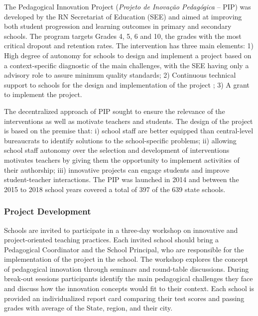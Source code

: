 \documentclass[11pt,a4paper]{article}
\begin{document}
	The Pedagogical Innovation Project (\textit{Projeto de Inovação Pedagógica} -- PIP) was developed by the RN Secretariat of Education (SEE) and aimed at improving both student progression and learning outcomes in primary and secondary schools. The program targets Grades 4, 5, 6 and 10, the grades with the most critical dropout and retention rates. The intervention has three main elements: 1) High degree of autonomy for schools to design and implement a project based on a context-specific diagnostic of the main challenges, with the SEE having only a advisory role to assure minimum quality standards; 2) Continuous technical support to schools for the design and implementation of the project ; 3) A grant to implement the project. 
	
	The decentralized approach of PIP sought to ensure the relevance of the interventions as well as motivate teachers and students. The design of the project is based on the premise that: i) school staff are better equipped than central-level bureaucrats to identify solutions to the school-specific problems; ii) allowing school staff autonomy over the selection and development of interventions motivates teachers by giving them the opportunity to implement activities of their authorship; iii) innovative projects can engage students and improve student-teacher interactions. The PIP was launched in 2014 and between the 2015 to 2018 school years covered a total of 397 of the 639 state schools.
	
	\subsubsection*{Project Development} \label{sec:project}
	
	Schools are invited to participate in a three-day workshop on innovative and project-oriented teaching practices. Each invited school should bring a Pedagogical Coordinator and the School Principal, who are responsible for the implementation of the project in the school. The workshop explores the concept of pedagogical innovation through seminars and round-table discussions. During break-out sessions participants identify the main pedagogical challenges they face and discuss how the innovation concepts would fit to their context. Each school is provided an individualized report card comparing their test scores and passing grades with average of the State, region, and their city.
	
\end{document}
